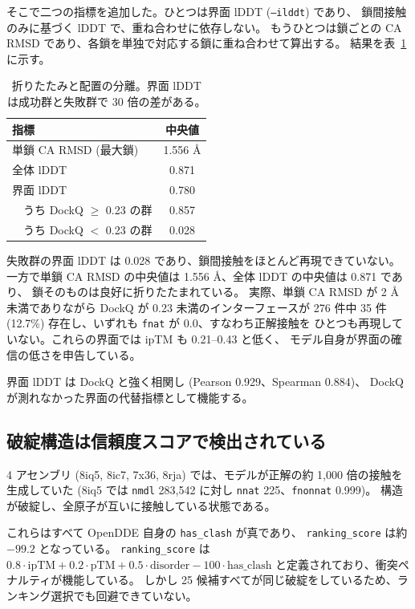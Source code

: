 \documentclass[11pt,a4paper]{article}
\begin{document}
そこで二つの指標を追加した。ひとつは界面 lDDT (\texttt{--ilddt}) であり、
鎖間接触のみに基づく lDDT で、重ね合わせに依存しない。
もうひとつは鎖ごとの CA RMSD であり、各鎖を単独で対応する鎖に重ね合わせて算出する。
結果を表~\ref{tab:decompose} に示す。

\begin{table}[htbp]
\centering
\caption{折りたたみと配置の分離。界面 lDDT は成功群と失敗群で 30 倍の差がある。}
\label{tab:decompose}
\begin{tabular}{lc}
\toprule
指標 & 中央値 \\
\midrule
単鎖 CA RMSD (最大鎖) & 1.556 \AA{} \\
全体 lDDT & 0.871 \\
界面 lDDT & 0.780 \\
\ \ うち DockQ $\geq$ 0.23 の群 & 0.857 \\
\ \ うち DockQ $<$ 0.23 の群 & 0.028 \\
\bottomrule
\end{tabular}
\end{table}

失敗群の界面 lDDT は 0.028 であり、鎖間接触をほとんど再現できていない。
一方で単鎖 CA RMSD の中央値は 1.556 \AA{}、全体 lDDT の中央値は 0.871 であり、
鎖そのものは良好に折りたたまれている。
実際、単鎖 CA RMSD が 2 \AA{} 未満でありながら DockQ が 0.23 未満のインターフェースが
276 件中 35 件 (12.7\%) 存在し、いずれも \texttt{fnat} が 0.0、すなわち正解接触を
ひとつも再現していない。これらの界面では ipTM も 0.21--0.43 と低く、
モデル自身が界面の確信の低さを申告している。

界面 lDDT は DockQ と強く相関し (Pearson 0.929、Spearman 0.884)、
DockQ が測れなかった界面の代替指標として機能する。

\subsection{破綻構造は信頼度スコアで検出されている}

4 アセンブリ (8iq5, 8ic7, 7x36, 8rja) では、モデルが正解の約 1,000 倍の接触を生成していた
(8iq5 では \texttt{nmdl} 283,542 に対し \texttt{nnat} 225、\texttt{fnonnat} 0.999)。
構造が破綻し、全原子が互いに接触している状態である。

これらはすべて OpenDDE 自身の \texttt{has\_clash} が真であり、
\texttt{ranking\_score} は約 $-99.2$ となっている。
\texttt{ranking\_score} は
$0.8 \cdot \mathrm{ipTM} + 0.2 \cdot \mathrm{pTM} + 0.5 \cdot \mathrm{disorder} - 100 \cdot \mathrm{has\_clash}$
と定義されており、衝突ペナルティが機能している。
しかし 25 候補すべてが同じ破綻をしているため、ランキング選択でも回避できていない。
\end{document}
